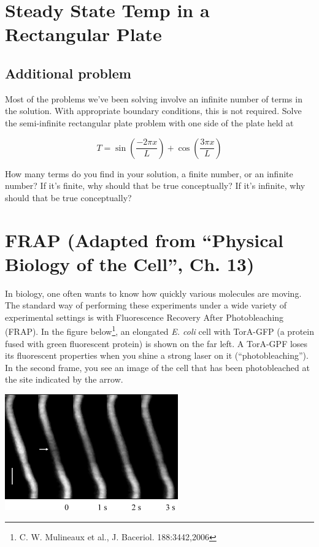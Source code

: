\documentclass[12pt]{article}
\begin{document}
\section{Steady State Temp in a Rectangular Plate}
\subsection{Additional problem} Most of the problems we've been solving involve an infinite number of terms in the solution. With appropriate boundary conditions, this is not required. Solve the semi-infinite rectangular plate problem with one side of the plate held at

\begin{equation}
  T = \sin\left(\frac{-2\pi x}{L}\right) + \cos\left(\frac{3\pi x}{L}\right)
\end{equation}

How many terms do you find in your solution, a finite number, or an infinite number? If it's finite, why should that be true conceptually? If it's infinite, why should that be true conceptually?


\section{FRAP (Adapted from ``Physical Biology of the Cell'', Ch. 13)}
In biology, one often wants to know how quickly various molecules are
moving. The standard way of performing these experiments under a wide
variety of experimental settings is with Fluorescence Recovery After
Photobleaching (FRAP). In the figure below\footnote{C. W. Mulineaux et
al., J. Baceriol. 188:3442,2006}, an elongated
\textit{E. coli} cell with TorA-GFP (a protein fused with green
fluorescent protein) is shown on the far left. A TorA-GPF loses its
fluorescent properties when you shine a strong laser on it
(``photobleaching''). In the second frame, you see an image of the
cell that has been photobleached at the site indicated by the
arrow. 

\includegraphics[height=50mm]{F5_large.pdf}
\end{document}
